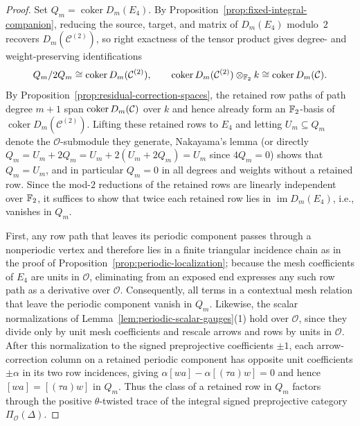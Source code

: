 \begin{proof}
Set $Q_m=\operatorname{coker}D_m(E_4)$. By Proposition~\ref{prop:fixed-integral-companion}, reducing the source, target, and matrix of $D_m(E_4)$ modulo~$2$ recovers $D_m(\mathcal C^{(2)})$, so right exactness of the tensor product gives degree- and weight-preserving identifications
\[
  Q_m/2Q_m\cong\operatorname{coker}D_m(\mathcal C^{(2)}),\qquad
  \operatorname{coker}D_m(\mathcal C^{(2)})\otimes_{\mathbb F_2}k\cong\operatorname{coker}D_m(\mathcal C).
\]
By Proposition~\ref{prop:residual-correction-spaces}, the retained row paths of path degree $m+1$ span $\operatorname{coker}D_m(\mathcal C)$ over $k$ and hence already form an $\mathbb F_2$-basis of $\operatorname{coker}D_m(\mathcal C^{(2)})$. Lifting these retained rows to $E_4$ and letting $U_m\subseteq Q_m$ denote the $\mathcal O$-submodule they generate, Nakayama's lemma (or directly $Q_m=U_m+2Q_m=U_m+2(U_m+2Q_m)=U_m$ since $4Q_m=0$) shows that $Q_m=U_m$, and in particular $Q_m=0$ in all degrees and weights without a retained row. Since the mod-$2$ reductions of the retained rows are linearly independent over $\mathbb F_2$, it suffices to show that twice each retained row lies in $\operatorname{im}D_m(E_4)$, i.e., vanishes in $Q_m$.

First, any row path that leaves its periodic component passes through a nonperiodic vertex and therefore lies in a finite triangular incidence chain as in the proof of Proposition~\ref{prop:periodic-localization}; because the mesh coefficients of $E_4$ are units in $\mathcal O$, eliminating from an exposed end expresses any such row path as a derivative over $\mathcal O$. Consequently, all terms in a contextual mesh relation that leave the periodic component vanish in $Q_m$. Likewise, the scalar normalizations of Lemma~\ref{lem:periodic-scalar-gauges}(1) hold over $\mathcal O$, since they divide only by unit mesh coefficients and rescale arrows and rows by units in $\mathcal O$. After this normalization to the signed preprojective coefficients $\pm1$, each arrow-correction column on a retained periodic component has opposite unit coefficients $\pm\alpha$ in its two row incidences, giving $\alpha[wa]-\alpha[(\tau a)w]=0$ and hence $[wa]=[(\tau a)w]$ in $Q_m$. Thus the class of a retained row in $Q_m$ factors through the positive $\theta$-twisted trace of the integral signed preprojective category $\Pi_{\mathcal O}(\Delta)$.


\end{proof}
